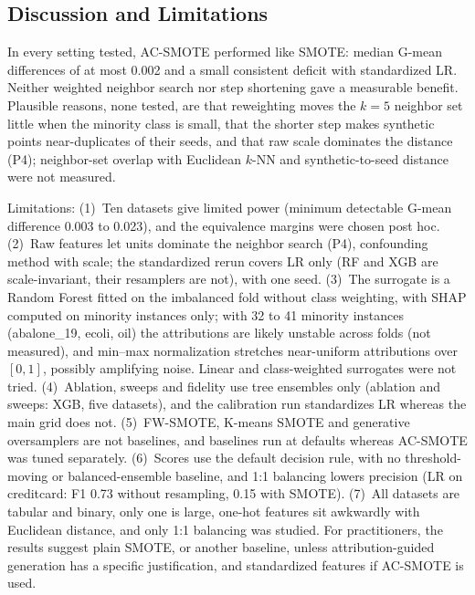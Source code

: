 \documentclass[conference,a4paper]{IEEEtran}
\newcommand{\acs}{AC-SMOTE}
\newcommand{\gmean}{\mbox{G-mean}}
\begin{document}
\subsection{Discussion and Limitations}\label{sec:disc}
In every setting tested, \acs{} performed like SMOTE: median \gmean{} differences of at most 0.002 and a small consistent deficit with standardized LR. Neither weighted neighbor search nor step shortening gave a measurable benefit. Plausible reasons, none tested, are that reweighting moves the $k=5$ neighbor set little when the minority class is small, that the shorter step makes synthetic points near-duplicates of their seeds, and that raw scale dominates the distance (P4); neighbor-set overlap with Euclidean $k$-NN and synthetic-to-seed distance were not measured.

Limitations: (1)~Ten datasets give limited power (minimum detectable \gmean{} difference 0.003 to 0.023), and the equivalence margins were chosen post hoc. (2)~Raw features let units dominate the neighbor search (P4), confounding method with scale; the standardized rerun covers LR only (RF and XGB are scale-invariant, their resamplers are not), with one seed. (3)~The surrogate is a Random Forest fitted on the imbalanced fold without class weighting, with SHAP computed on minority instances only; with 32 to 41 minority instances (abalone\_19, ecoli, oil) the attributions are likely unstable across folds (not measured), and min--max normalization stretches near-uniform attributions over $[0,1]$, possibly amplifying noise. Linear and class-weighted surrogates were not tried. (4)~Ablation, sweeps and fidelity use tree ensembles only (ablation and sweeps: XGB, five datasets), and the calibration run standardizes LR whereas the main grid does not. (5)~FW-SMOTE, K-means SMOTE and generative oversamplers are not baselines, and baselines run at defaults whereas \acs{} was tuned separately. (6)~Scores use the default decision rule, with no threshold-moving or balanced-ensemble baseline, and 1:1 balancing lowers precision (LR on creditcard: F1 0.73 without resampling, 0.15 with SMOTE). (7)~All datasets are tabular and binary, only one is large, one-hot features sit awkwardly with Euclidean distance, and only 1:1 balancing was studied. For practitioners, the results suggest plain SMOTE, or another baseline, unless attribution-guided generation has a specific justification, and standardized features if \acs{} is used.
\end{document}
